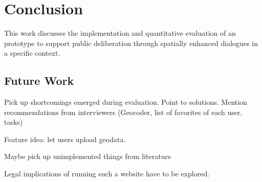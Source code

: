 \section{Conclusion}

This work discusses the implementation and quantitative evaluation of an prototype to support public deliberation through spatially enhanced dialogues in a specific context.

\subsection{Future Work}
Pick up shortcomings emerged during evaluation. Point to solutions. Mention recommendations from interviewers (Geocoder, list of favorites of each user, tasks)

Feature idea: let users upload geodata.

Maybe pick up unimplemented things from literature

Legal implications of running such a website have to be explored.